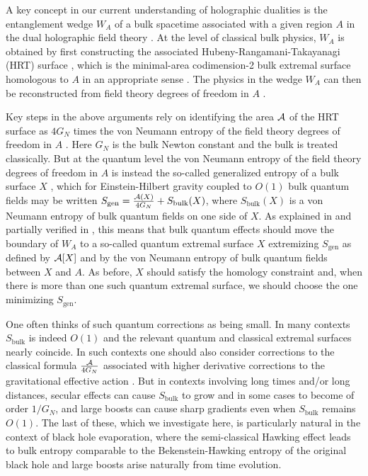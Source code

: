\documentclass[12pt]{article}
\begin{document}
A key concept in our current understanding of holographic dualities is the entanglement wedge $W_A$ of a bulk spacetime associated with a given region $A$ in the dual holographic field theory \cite{Czech:2012bh,Wall:2012uf,Headrick:2014cta}.  At the level of classical bulk physics, $W_A$ is obtained by first constructing the associated Hubeny-Rangamani-Takayanagi (HRT) surface \cite{Hubeny:2007xt}, which is the minimal-area codimension-2 bulk extremal surface homologous to $A$ in an appropriate sense \cite{Headrick:2007km}.  The physics in the wedge $W_A$ can then be reconstructed from field theory degrees of freedom in $A$ \cite{Almheiri:2014lwa,Jafferis:2015del,Dong:2016eik,Faulkner:2017vdd}.

Key steps in the above arguments rely on identifying the area ${\cal A}$ of the HRT surface as $4G_N$ times the von Neumann entropy of the field theory degrees of freedom in $A$ \cite{Ryu:2006bv,Ryu:2006ef,Hubeny:2007xt,Lewkowycz:2013nqa,Dong:2016hjy}.  Here $G_N$ is the bulk Newton constant and the bulk is treated classically.  But at the quantum level the von Neumann entropy of the field theory degrees of freedom in $A$ is instead the so-called generalized entropy of a bulk surface $X$ \cite{Faulkner:2013ana}, which for Einstein-Hilbert gravity coupled to $O(1)$ bulk quantum fields may be written $S_{\mathrm{gen}} = \frac{{\cal A}(X)}{4G_N} + S_{\mathrm{bulk}}(X)$, where $S_{\mathrm{bulk}}(X)$ is a von Neumann entropy of bulk quantum fields on one side of $X$.  As explained in \cite{Engelhardt:2014gca} and partially verified in \cite{Dong:2016hjy}, this means that bulk quantum effects should move the boundary of $W_A$ to a so-called quantum extremal surface $X$ extremizing
$S_{\mathrm{gen}}$ as defined by ${\cal A}[X]$ and by the von Neumann entropy of bulk quantum fields between $X$ and $A$.  As before, $X$ should satisfy the homology constraint and, when there is more than one such quantum extremal surface, we should choose the one minimizing $S_{\mathrm{gen}}$.

One often thinks of such quantum corrections as being small.  In many contexts $S_{\mathrm{bulk}}$ is indeed $O(1)$ and the relevant quantum and classical extremal surfaces nearly coincide.  In such contexts one should also consider corrections to the classical formula $\frac{{\cal A}}{4G_N}$ associated with higher derivative corrections to the gravitational effective action \cite{Wald:1993nt,Iyer:1995kg,Jacobson:1993vj,Dong:2013qoa,Miao:2014nxa}.  But in contexts involving long times and/or long distances, secular effects can cause $S_{\mathrm{bulk}}$ to grow and in some cases to become of order $1/G_N$, and large boosts can cause sharp gradients even when $S_{\mathrm{bulk}}$ remains $O(1)$. The last of these, which we investigate here, is particularly natural in the context of black hole evaporation, where the semi-classical Hawking effect leads to bulk entropy comparable to the Bekenstein-Hawking entropy of the original black hole \cite{Zurek:1982zz,Page:1983ug} and large boosts arise naturally from time evolution.
\end{document}
